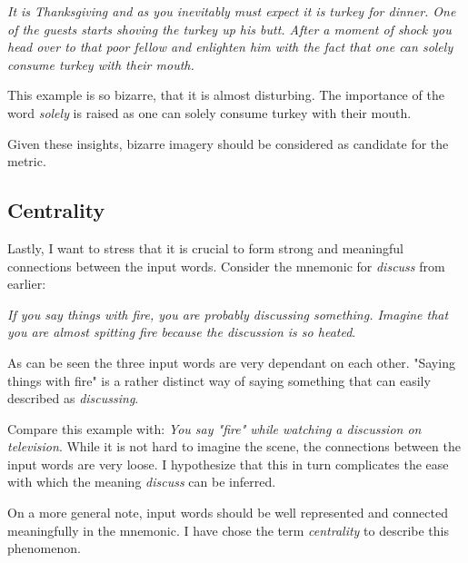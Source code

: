 \emph{It is Thanksgiving and as you inevitably must expect it is turkey for dinner. One of the guests starts shoving the turkey up his butt. After a moment of shock you head over to that poor fellow and  enlighten him with the fact that one can solely consume turkey with their mouth.}

This example is so bizarre, that it is almost disturbing. The importance of the word \emph{solely} is raised as one can solely consume turkey with their mouth. 

Given these insights, bizarre imagery should be considered as candidate for the metric.

\subsection{Centrality}
Lastly, I want to stress that it is crucial to form strong and meaningful connections between the input words. Consider the mnemonic for \emph{discuss} from earlier:

\emph{If you say things with fire, you are probably discussing something. Imagine that you are almost spitting fire because the discussion is so heated}.

As can be seen the three input words are very dependant on each other. "Saying things with fire" is a rather distinct way of saying something that can easily described as \emph{discussing}.

Compare this example with: \emph{You say "fire" while watching a discussion on television}. While it is not hard to imagine the scene, the connections between the input words are very loose. I hypothesize that this in turn complicates the ease with which the meaning \emph{discuss} can be inferred.  

On a more general note, input words should be well represented and connected meaningfully in the mnemonic. I have chose the term \emph{centrality} to describe this phenomenon.